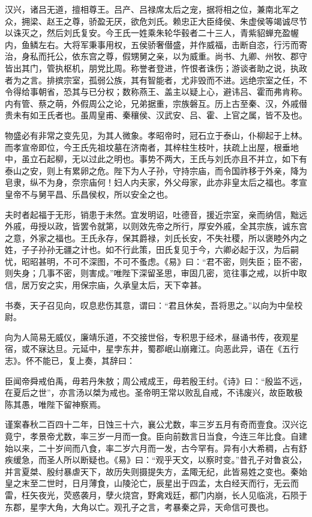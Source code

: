 \documentclass[]{article}
\begin{document}
汉兴，诸吕无道，擅相尊王。吕产、吕禄席太后之宠，据将相之位，兼南北军之众，拥梁、赵王之尊，骄盈无厌，欲危刘氏。赖忠正大臣绛侯、朱虚侯等竭诚尽节以诛灭之，然后刘氏复安。今王氏一姓乘朱轮华毂者二十三人，青紫貂蝉充盈幄内，鱼鳞左右。大将军秉事用权，五侯骄奢僣盛，并作威福，击断自恣，行污而寄治，身私而托公，依东宫之尊，假甥舅之亲，以为威重。尚书、九卿、州牧、郡守皆出其门，管执枢机，朋党比周。称誉者登进，忤恨者诛伤；游谈者助之说，执政者为之言。排摈宗室，孤弱公族，其有智能者，尤非毁而不进。远绝宗室之任，不令得给事朝省，恐其与已分权；数称燕王、盖主以疑上心，避讳吕、霍而弗肯称。内有管、蔡之萌，外假周公之论，兄弟据重，宗族磐互。历上古至秦、汉，外戚僣贵未有如王氏者也。虽周皇甫、秦穰侯、汉武安、吕、霍、上官之属，皆不及也。

物盛必有非常之变先见，为其人微象。孝昭帝时，冠石立于泰山，仆柳起于上林。而孝宣帝即位，今王氏先祖坟墓在济南者，其梓柱生枝叶，扶疏上出屋，根垂地中，虽立石起柳，无以过此之明也。事势不两大，王氏与刘氏亦且不并立，如下有泰山之安，则上有累卵之危。陛下为人子孙，守持宗庙，而令国祚移于外亲，降为皂隶，纵不为身，奈宗庙何！妇人内夫家，外父母家，此亦非皇太后之福也。孝宣皇帝不与舅平昌、乐昌侯权，所以安全之也。

夫时者起福于无形，销患于未然。宜发明诏，吐德音，援近宗室，亲而纳信，黜远外戚，毋授以政，皆罢令就第，以则效先帝之所行，厚安外戚，全其宗族，诚东宫之意，外家之福也。王氏永存，保其爵禄，刘氏长安，不失社稷，所以褒睦外内之姓，子子孙孙无疆之计也。如不行此策，田氏复见于今，六卿必起于汉，为后嗣忧，昭昭甚明，不可不深图，不可不蚤虑。《易》曰：``君不密，则失臣；臣不密，则失身；几事不密，则害成。''唯陛下深留圣思，审固几密，览往事之戒，以折中取信，居万安之实，用保宗庙，久承皇太后，天下幸甚。

书奏，天子召见向，叹息悲伤其意，谓曰：``君且休矣，吾将思之。''以向为中垒校尉。

向为人简易无威仪，廉靖乐道，不交接世俗，专积思于经术，昼诵书传，夜观星宿，或不寐达旦。元延中，星孛东井，蜀郡岷山崩雍江。向恶此异，语在《五行志》。怀不能已，复上奏，其辞曰：

臣闻帝舜戒伯禹，毋若丹朱敖；周公戒成王，毋若殷王纣。《诗》曰：``殷监不远，在夏后之世''，亦言汤以桀为戒也。圣帝明王常以败乱自戒，不讳废兴，故臣敢极陈其愚，唯陛下留神察焉。

谨案春秋二百四十二年，日蚀三十六，襄公尤数，率三岁五月有奇而壹食。汉兴讫竟宁，孝景帝尤数，率三岁一月而一食。臣向前数言日当食，今连三年比食。自建始以来，二十岁间而八食，率二岁六月而一发，古今罕有。异有小大希稠，占有舒疾缓急，而圣人所以断疑也。《易》曰：``观乎天文，以察时变。''昔孔子对鲁哀公，并言夏桀、殷纣暴虐天下，故历失则摄提失方，孟陬无纪，此皆易姓之变也。秦始皇之末至二世时，日月薄食，山陵沦亡，辰星出于四孟，太白经天而行，无云而雷，枉矢夜光，荧惑袭月，孽火烧宫，野禽戏廷，都门内崩，长人见临洮，石陨于东郡，星孛大角，大角以亡。观孔子之言，考暴秦之异，天命信可畏也。
\end{document}
